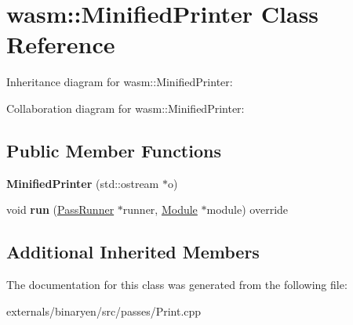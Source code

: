 \hypertarget{classwasm_1_1_minified_printer}{}\section{wasm\+:\+:Minified\+Printer Class Reference}
\label{classwasm_1_1_minified_printer}


Inheritance diagram for wasm\+:\+:Minified\+Printer\+:


Collaboration diagram for wasm\+:\+:Minified\+Printer\+:
\subsection*{Public Member Functions}
\begin{DoxyCompactItemize}
\item 
\mbox{\label{classwasm_1_1_minified_printer_aba419d8097a779a53655a44cc79958dd}} 
{\bfseries Minified\+Printer} (std\+::ostream $\ast$o)
\item 
\mbox{\label{classwasm_1_1_minified_printer_a5bb1315a28928940c7bad4bdd2defcd3}} 
void {\bfseries run} (\mbox{\hyperlink{structwasm_1_1_pass_runner}{Pass\+Runner}} $\ast$runner, \mbox{\hyperlink{classwasm_1_1_module}{Module}} $\ast$module) override
\end{DoxyCompactItemize}
\subsection*{Additional Inherited Members}


The documentation for this class was generated from the following file\+:\begin{DoxyCompactItemize}
\item 
externals/binaryen/src/passes/Print.\+cpp\end{DoxyCompactItemize}
